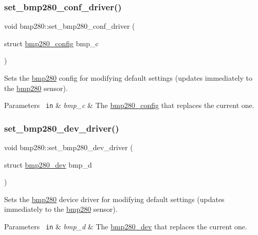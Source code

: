 \subsubsection{\texorpdfstring{set\_bmp280\_conf\_driver()}{set\_bmp280\_conf\_driver()}}
{\footnotesize\ttfamily void bmp280\+::set\+\_\+bmp280\+\_\+conf\+\_\+driver (\begin{DoxyParamCaption}\item[{struct \mbox{\hyperlink{structbmp280__config}{bmp280\+\_\+config}}}]{bmp\+\_\+c }\end{DoxyParamCaption})}



Sets the \mbox{\hyperlink{classbmp280}{bmp280}} config for modifying default settings (updates immediately to the \mbox{\hyperlink{classbmp280}{bmp280}} sensor). 


\begin{DoxyParams}[1]{Parameters}
\mbox{\texttt{ in}}  & {\em bmp\+\_\+c} & The \mbox{\hyperlink{structbmp280__config}{bmp280\+\_\+config}} that replaces the current one. \\
\hline
\end{DoxyParams}
\mbox{\label{classbmp280_abf2047614752774902d6897bf0de8c02}} 
\subsubsection{\texorpdfstring{set\_bmp280\_dev\_driver()}{set\_bmp280\_dev\_driver()}}
{\footnotesize\ttfamily void bmp280\+::set\+\_\+bmp280\+\_\+dev\+\_\+driver (\begin{DoxyParamCaption}\item[{struct \mbox{\hyperlink{structbmp280__dev}{bmp280\+\_\+dev}}}]{bmp\+\_\+d }\end{DoxyParamCaption})}



Sets the \mbox{\hyperlink{classbmp280}{bmp280}} device driver for modifying default settings (updates immediately to the \mbox{\hyperlink{classbmp280}{bmp280}} sensor). 


\begin{DoxyParams}[1]{Parameters}
\mbox{\texttt{ in}}  & {\em bmp\+\_\+d} & The \mbox{\hyperlink{structbmp280__dev}{bmp280\+\_\+dev}} that replaces the current one. \\
\hline
\end{DoxyParams}


